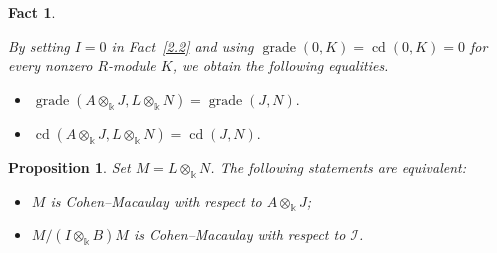 \documentclass[10pt,a4paper]{amsart}
\numberwithin{equation}{theorem}
\newtheorem{proposition}[theorem]{Proposition}
\theoremstyle{definition}
\theoremstyle{fact}
\newtheorem{fact}[theorem]{Fact}
\theoremstyle{conjecture}
\newcommand{\grade}{\operatorname{grade}}
\newcommand{\cd}{\operatorname{cd}}
\begin{document}
\vspace{.2cm}
\vspace{.3cm}
\begin{fact}
\label{6.1}{\em
By setting $I=0$ in Fact~\ref{2.2} and using
$\grade(0, K)=\cd(0, K)=0$ for every nonzero $R$-module $K$,
we obtain the following equalities.
\begin{itemize}
\item[(a)] $\grade(A\otimes_\Bbbk J, L\otimes_\Bbbk N)=\grade(J,N).$
\item[(b)] $\cd(A\otimes_\Bbbk J, L\otimes_\Bbbk N)=\cd(J,N).$
\end{itemize}}
\end{fact}
\begin{proposition}
\label{6.2}
Set $M = L \otimes_\Bbbk N$.  The following statements are equivalent:
\begin{itemize}
\item[(a)] $M$ is Cohen--Macaulay with respect to $A \otimes_\Bbbk J$;
\item[(b)] $M /(I \otimes_\Bbbk B)M$ is Cohen--Macaulay with respect to $\mathcal{I}$.
\end{itemize}
\end{proposition}
\end{document}
